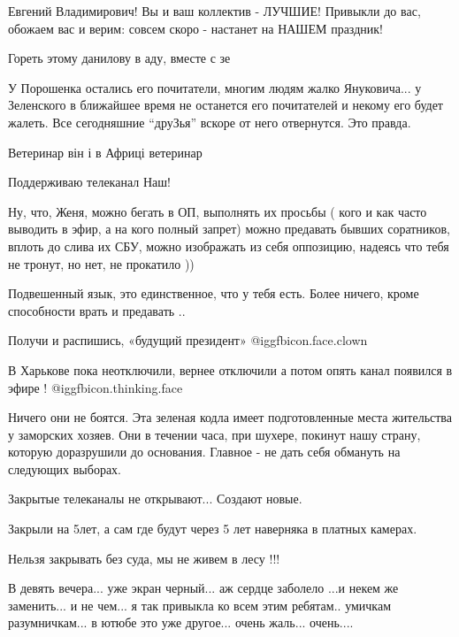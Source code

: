 \begin{itemize}

Евгений Владимирович! Вы и ваш коллектив - ЛУЧШИЕ! Привыкли до вас, обожаем вас
и верим: совсем скоро - настанет на НАШЕМ праздник!

Гореть этому данилову в аду, вместе с зе


У Порошенка остались его почитатели, многим людям жалко Януковича... у
Зеленского в ближайшее время не останется его почитателей и некому его будет
жалеть. Все сегодняшние \enquote{друЗья} вскоре от него отвернутся. Это правда.

Ветеринар він і в Африці ветеринар

Поддерживаю телеканал Наш!


Ну, что, Женя, можно бегать в ОП, выполнять их просьбы ( кого и как часто
выводить в эфир, а на кого полный запрет) можно предавать бывших соратников,
вплоть до слива их СБУ, можно изображать из себя оппозицию, надеясь что тебя не
тронут, но нет, не прокатило ))

Подвешенный язык, это единственное, что у тебя есть. Более ничего, кроме
способности врать и предавать ..

Получи и распишись, «будущий президент»  @igg{fbicon.face.clown} 


В Харькове пока неотключили, вернее отключили а потом опять канал появился в
эфире ! @igg{fbicon.thinking.face} 


Ничего они не боятся. Эта зеленая кодла имеет подготовленные места жительства у
заморских хозяев. Они в течении часа, при шухере, покинут нашу страну, которую
доразрушили до основания. Главное - не дать себя обмануть на следующих выборах.

Закрытые телеканалы не открывают... Создают новые.

Закрыли на 5лет, а сам где будут через 5 лет наверняка в платных камерах.

Нельзя закрывать без суда, мы не живем в лесу !!!


В девять вечера... уже экран черный... аж сердце заболело ...и некем же
заменить... и не чем... я так привыкла ко всем этим ребятам.. умичкам
разумничкам... в ютюбе это уже другое... очень жаль... очень....


\end{itemize}

